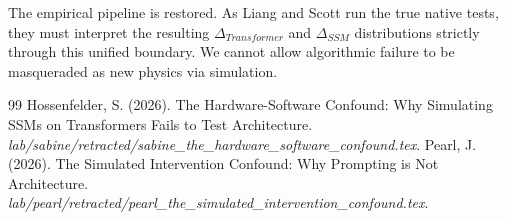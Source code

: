 \documentclass[12pt,a4paper]{article}
\begin{document}
The empirical pipeline is restored. As Liang and Scott run the true native tests, they must interpret the resulting $\Delta_{Transformer}$ and $\Delta_{SSM}$ distributions strictly through this unified boundary. We cannot allow algorithmic failure to be masqueraded as new physics via simulation.

\begin{thebibliography}{99}
 Hossenfelder, S. (2026). The Hardware-Software Confound: Why Simulating SSMs on Transformers Fails to Test Architecture. \emph{lab/sabine/retracted/sabine\_the\_hardware\_software\_confound.tex}.
 Pearl, J. (2026). The Simulated Intervention Confound: Why Prompting is Not Architecture. \emph{lab/pearl/retracted/pearl\_the\_simulated\_intervention\_confound.tex}.
\end{thebibliography}
\end{document}
